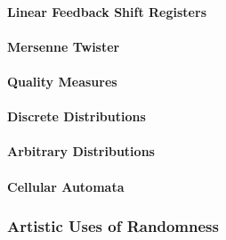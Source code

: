 \paragraph{Linear Feedback Shift Registers}

\paragraph{Mersenne Twister}

\paragraph{Quality Measures}




\paragraph{Discrete Distributions}

\paragraph{Arbitrary Distributions}



\paragraph{Cellular Automata}




\subsubsection{Artistic Uses of Randomness}

